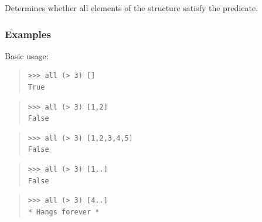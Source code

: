 \begin{haddockdesc}
\item[\begin{tabular}{@{}l}
all :: Foldable t => (a -> Bool) -> t a -> Bool
\end{tabular}]
{\haddockbegindoc
Determines whether all elements of the structure satisfy the predicate.\par
\subsubsection*{\textbf{Examples}}
Basic usage:\par
\begin{quote}
{\haddockverb\begin{verbatim}
>>> all (> 3) []
True

\end{verbatim}}
\end{quote}
\begin{quote}
{\haddockverb\begin{verbatim}
>>> all (> 3) [1,2]
False

\end{verbatim}}
\end{quote}
\begin{quote}
{\haddockverb\begin{verbatim}
>>> all (> 3) [1,2,3,4,5]
False

\end{verbatim}}
\end{quote}
\begin{quote}
{\haddockverb\begin{verbatim}
>>> all (> 3) [1..]
False

\end{verbatim}}
\end{quote}
\begin{quote}
{\haddockverb\begin{verbatim}
>>> all (> 3) [4..]
* Hangs forever *

\end{verbatim}}
\end{quote}}
\end{haddockdesc}
